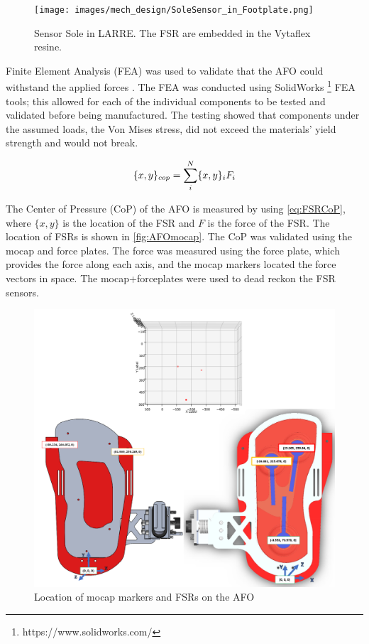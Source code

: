 \begin{figure}[h!]
    \centering
    \texttt{[image: images/mech\_design/SoleSensor\_in\_Footplate.png]}
    \caption[Sensing Sole]{Sensor Sole in LARRE. The FSR are embedded in the Vytaflex resine.}
    \label{fig:SensingSole}
\end{figure}



Finite Element Analysis (FEA) was used to validate that the AFO could withstand the applied forces \cite{akin2010finite}. The FEA  was conducted using SolidWorks \footnote{https://www.solidworks.com/} FEA tools; this allowed for each of the individual components to be tested and validated before being manufactured. The testing showed that components under the assumed loads, the Von Mises \cite{shigley} stress, did not exceed the materials' yield strength and would not break.

\begin{equation}
\large
    \{x,y\}_{cop} = \sum_{i}^{N} \{x,y\}_i F_i
    \label{eq:FSRCoP}
\end{equation}

The Center of Pressure (CoP) of the AFO is measured by using \autoref{eq:FSRCoP}, where $\{x,y\}$ is the location of the FSR and $F$ is the force of the FSR. The location of FSRs is shown in \autoref{fig:AFOmocap}. The CoP was validated using the mocap and force plates. The force was measured using the force plate, which provides the force along each axis, and the mocap markers located the force vectors in space. The mocap+forceplates were used to dead reckon the FSR sensors. 




 \begin{figure}[h!]
    \ContinuedFloat
           \captionsetup{justification=centering}
           \centerline{ \includegraphics[scale=0.25]{images/mech_design/Mocap_Layout_2.png}}
            \caption[AFO Mocap Markers]{Location of mocap markers and FSRs on the AFO \cite{Michaels2020}}
            \label{fig:AFOmocap}
    \end{figure}


